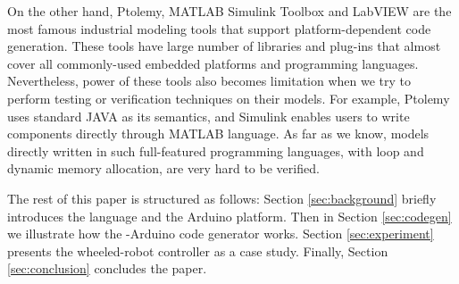 On the other hand, Ptolemy\cite{PtolemyBook2014}, MATLAB Simulink Toolbox\cite{hahn2016essentialsimulink} and LabVIEW\cite{labview} are the most famous industrial modeling tools that support platform-dependent code generation. These tools have large number of libraries and plug-ins that almost cover all commonly-used embedded platforms and programming languages. Nevertheless, power of these tools also becomes limitation when we try to perform testing or verification techniques on their models. For example, Ptolemy uses standard JAVA as its semantics, and Simulink enables users to write components directly through MATLAB language. As far as we know, models directly written in such full-featured programming languages, with loop and dynamic memory allocation, are very hard to be verified.

The rest of this paper is structured as follows: Section \ref{sec:background} briefly introduces the \lang{} language and the Arduino platform. Then in Section \ref{sec:codegen} we illustrate how the \lang{}-Arduino code generator works. Section \ref{sec:experiment} presents the wheeled-robot controller as a case study. Finally, Section \ref{sec:conclusion} concludes the paper.